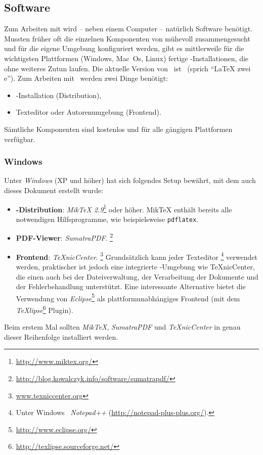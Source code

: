 \subsection{Software}
\label{sec:Software}

Zum Arbeiten mit \latex wird -- neben einem Computer -- natürlich Software benötigt. Mussten früher oft die einzelnen Komponenten von \latex mühevoll zusammengesucht und für die eigene Umgebung konfiguriert werden, gibt es mittlerweile für die wichtigsten Plattformen (Windows, Mac~Os, Linux) fertige \latex-Installationen, die ohne weiteres Zutun laufen. Die aktuelle Version von \latex\ ist \LaTeXe\ (sprich "`LaTeX zwei e"'). 
Zum Arbeiten mit \latex\ werden zwei Dinge benötigt:
%
\begin{itemize}
\item \latex-Installation (Distribution),
\item Texteditor oder Autorenumgebung (Frontend).
\end{itemize}
%
Sämtliche Komponenten sind kostenlos und für alle gängigen Plattformen verfügbar.


\subsubsection{Windows}
\label{sec:Windows}

Unter \emph{Windows} (XP und höher) hat sich folgendes Setup bewährt,
mit dem \ua auch dieses Dokument erstellt wurde:
%
\begin{itemize}
\item \textbf{\latex-Distribution}: \emph{MikTeX 2.9}\footnote{\url{http://www.miktex.org/}} oder höher.
MikTeX enthält bereits alle notwendigen Hilfsprogramme, wie beispielsweise {\tt pdflatex}.

\item \textbf{PDF-Viewer}: \emph{SumatraPDF}.%
\footnote{\url{http://blog.kowalczyk.info/software/sumatrapdf/}}

\item \textbf{Frontend}: \emph{TeXnicCenter}.%
\footnote{\url{www.texniccenter.org}}
Grundsätzlich kann jeder Texteditor%
\footnote{Unter Windows \zB\ \emph{Notepad++} (\url{http://notepad-plus-plus.org/}).}
verwendet werden, praktischer ist jedoch eine integrierte \latex-Um\-geb\-ung wie TeXnicCenter, die einen auch bei 
der Dateiverwaltung, der Verarbeitung der Dokumente und der Fehlerbehandlung unterstützt.
Eine interessante Alternative bietet die Verwendung von \emph{Eclipse}\footnote{\url{http://www.eclipse.org/}}
als plattformunabhängiges Frontend 
(mit dem \emph{TeXlipse}\footnote{\url{http://texlipse.sourceforge.net/}} Plugin).
\end{itemize}
%
Beim erstem Mal sollten \emph{MikTeX}, \emph{SumatraPDF} und \emph{TeXnicCenter} in genau dieser Reihenfolge installiert werden.

